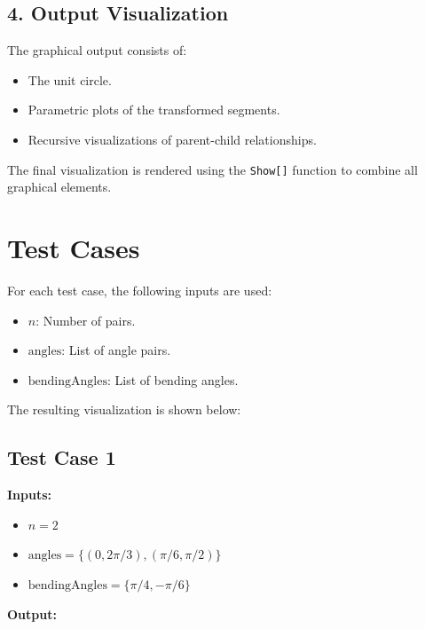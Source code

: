 \documentclass[a4paper,12pt]{article}
\begin{document}
\subsection*{4. Output Visualization}
The graphical output consists of:
\begin{itemize}
    \item The unit circle.
    \item Parametric plots of the transformed segments.
    \item Recursive visualizations of parent-child relationships.
\end{itemize}

The final visualization is rendered using the \texttt{Show[]} function to combine all graphical elements.

\section*{Test Cases}
For each test case, the following inputs are used:
\begin{itemize}
    \item \( n \): Number of pairs.
    \item \( \text{angles} \): List of angle pairs.
    \item \( \text{bendingAngles} \): List of bending angles.
\end{itemize}

The resulting visualization is shown below:

\subsection*{Test Case 1}
\textbf{Inputs:}
\begin{itemize}
    \item \( n = 2 \)
    \item \( \text{angles} = \{(0, 2\pi/3), (\pi/6, \pi/2)\} \)
    \item \( \text{bendingAngles} = \{\pi/4, -\pi/6\} \)
\end{itemize}
\textbf{Output:}\\
\end{document}
